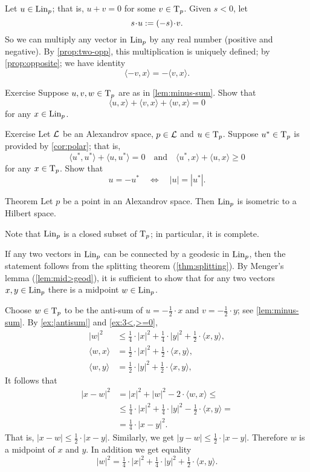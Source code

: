 Let $u\in \mathop{\rm Lin}\nolimits_p$; that is, $u+v=0$ for some $v\in\mathrm{T}_p$.
Given $s<0$, let 
\[s\cdot u\df (-s)\cdot v.\]
So we can multiply any vector in $\mathop{\rm Lin}\nolimits_p$ by any real number (positive and negative).
By \ref{prop:two-opp}, this multiplication is uniquely defined;
by \ref{prop:opposite}; we have identity
\[\langle -v,x\rangle=-\langle v,x\rangle.\]


\begin{thm}{Exercise}\label{ex:3<,>=0}
Suppose $u,v,w\in\mathrm{T}_p$ are as in \ref{lem:minus-sum}.
Show that
\[\langle u,x\rangle +\langle v,x\rangle +\langle w,x\rangle = 0\]
for any $x\in \mathop{\rm Lin}\nolimits_p$.
\end{thm}

\begin{thm}{Exercise}\label{ex:-u}
Let $\mathcal{L}$ be an Alexandrov space,
$p\in \mathcal{L}$ and $u\in \mathrm{T}_p$.
Suppose $u^*\in \mathrm{T}_p$ is provided by \ref{cor:polar};
that is, 
\[\langle u^*,u^*\rangle +\langle u,u^*\rangle = 0
\quad\text{and}\quad
\langle u^*,x\rangle +\langle u,x\rangle \ge 0
\]
for any $x\in \mathrm{T}_p$.
Show that 
\[u=-u^*\quad\Longleftrightarrow\quad|u|=|u^*|.\]
\end{thm}

\begin{thm}{Theorem}\label{thm:lin-subcone}
Let $p$ be a point in an Alexandrov space. 
Then $\mathop{\rm Lin}\nolimits_p$ is isometric to a Hilbert space.
\end{thm}

Note that $\mathop{\rm Lin}\nolimits_p$ is a closed subset of $\mathrm{T}_p$;
in particular, it is complete.

If any two vectors in $\mathop{\rm Lin}\nolimits_p$ can be connected by a geodesic in $\mathop{\rm Lin}\nolimits_p$,
then the statement follows from the splitting theorem (\ref{thm:splitting}).
By Menger's lemma (\ref{lem:mid>geod}), it is sufficient to show that for any two vectors $x,y\in\mathop{\rm Lin}\nolimits_p$
there is a midpoint $w\in \mathop{\rm Lin}\nolimits_p$.

Choose $w\in \mathrm{T}_p$ to be the anti-sum of $u=-\tfrac{1}{2}\cdot x$ and $v=-\tfrac{1}{2}\cdot y$;
see \ref{lem:minus-sum}.
By \ref{ex:|antisum|} and \ref{ex:3<,>=0},
\begin{align*}
|w|^2&\le \tfrac14\cdot |x|^2+\tfrac14\cdot|y|^2+\tfrac12\cdot\langle x,y\rangle,
\\
\langle w,x\rangle&= \tfrac12\cdot|x|^2+\tfrac12\cdot\langle x,y\rangle,
\\
\langle w,y\rangle&= \tfrac12\cdot|y|^2+\tfrac12\cdot\langle x,y\rangle,
\end{align*}
It follows that 
\begin{align*}
|x-w|^2
&= |x|^2+|w|^2-2\cdot\langle w,x\rangle\le
\\
&\le \tfrac14\cdot |x|^2+\tfrac14\cdot|y|^2-\tfrac12\cdot\langle x,y\rangle=
\\
&=\tfrac14\cdot|x-y|^2.
\end{align*}
That is, $|x-w|\le \tfrac12\cdot|x-y|$.
Similarly, we get $|y-w|\le \tfrac12\cdot|x-y|$.
Therefore $w$ is a midpoint of $x$ and $y$.
In addition we get equality 
\[|w|^2= \tfrac14\cdot |x|^2+\tfrac14\cdot|y|^2+\tfrac12\cdot\langle x,y\rangle.\]

